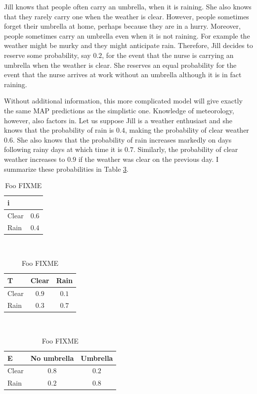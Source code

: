 Jill knows that people often carry an umbrella, when it is
raining. She also knows that they rarely carry one when the weather is
clear. However, people sometimes forget their umbrella at home,
perhaps because they are in a hurry. Moreover, people sometimes carry
an umbrella even when it is not raining. For example the weather might
be murky and they might anticipate rain. Therefore, Jill decides to
reserve some probability, say $0.2$, for the event that the nurse is
carrying an umbrella when the weather is clear. She reserves an equal
probability for the event that the nurse arrives at work without an
umbrella although it is in fact raining.
 
Without additional information, this more complicated model will give
exactly the same MAP predictions as the simplistic one. Knowledge of
meteorology, however, also factors in. Let us suppose Jill is a
weather enthusiast and she knows that the probability of rain is
$0.4$, making the probability of clear weather $0.6$. She also knows
that the probability of rain increases markedly on days following
rainy days at which time it is $0.7$.  Similarly, the probability of
clear weather increases to $0.9$ if the weather was clear on the
previous day. I summarize these probabilities in Table \ref{hmm-ex-1}.

\begin{table}[!htb]
\begin{center}
\begin{tabular}{|l|c|}
\hline
   i   &       \\
\hline
Clear  & $0.6$ \\
Rain   & $0.4$ \\
\hline
\end{tabular}~~~
\begin{tabular}{|l|cc|}
\hline
   T   & Clear & Rain  \\
\hline
Clear  & $0.9$ & $0.1$ \\
Rain   & $0.3$ & $0.7$ \\
\hline
\end{tabular}~~~
\begin{tabular}{|l|cc|}
\hline
   E    & No umbrella & Umbrella \\
\hline
Clear   & $0.8$ &  $0.2$         \\
Rain    & $0.2$ &  $0.8$         \\
\hline
\end{tabular}
\end{center}
\caption{Foo FIXME}\label{hmm-ex-1}
\end{table}

